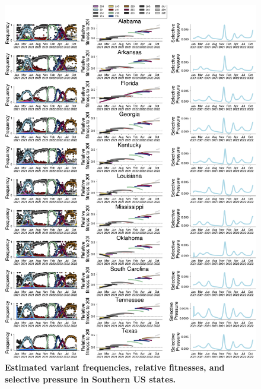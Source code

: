 \documentclass[11pt,oneside,letterpaper]{article}
\begin{document}
\begin{figure}[t!]
    \centering
    \includegraphics[width=1.0\textwidth=0.01]{./supplementary_figures/selective-pressure-analysis_South.png}
    \caption{
      \textbf{Estimated variant frequencies, relative fitnesses, and selective pressure in Southern US states.}
    }
    \label{fig:selective_pressure_south}
\end{figure}
\end{document}
